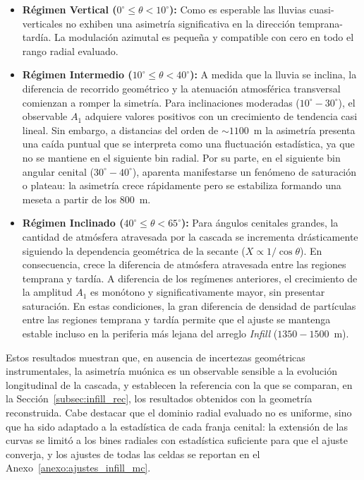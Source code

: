 \vspace{1cm}

\begin{itemize}
	\item \textbf{Régimen Vertical ($0^\circ \leq \theta < 10^\circ$):} Como es esperable las lluvias cuasi-verticales no exhiben una asimetría significativa en la dirección temprana-tardía. La modulación azimutal es pequeña y compatible con cero en todo el rango radial evaluado.
	
	\item \textbf{Régimen Intermedio ($10^\circ \leq \theta < 40^\circ$):} A medida que la lluvia se inclina, la diferencia de recorrido geométrico y la atenuación atmosférica transversal comienzan a romper la simetría. Para inclinaciones moderadas ($10^\circ - 30^\circ$), el observable $A_1$ adquiere valores positivos con un crecimiento de tendencia casi lineal. Sin embargo, a distancias del orden de $\sim 1100$~m la asimetría presenta una caída puntual que se interpreta como una fluctuación estadística, ya que no se mantiene en el siguiente bin radial. Por su parte, en el siguiente bin angular cenital ($30^\circ - 40^\circ$), aparenta manifestarse un fenómeno de saturación o plateau: la asimetría crece rápidamente pero se estabiliza formando una meseta a partir de los $800$~m.
	
	\item \textbf{Régimen Inclinado ($40^\circ \leq \theta < 65^\circ$):} Para ángulos cenitales grandes, la cantidad de atmósfera atravesada por la cascada se incrementa drásticamente siguiendo la dependencia geométrica de la secante ($X \propto 1/\cos\theta$). En consecuencia, crece la diferencia de atmósfera atravesada entre las regiones temprana y tardía. A diferencia de los regímenes anteriores, el crecimiento de la amplitud $A_1$ es monótono y significativamente mayor, sin presentar saturación. En estas condiciones, la gran diferencia de densidad de partículas entre las regiones temprana y tardía permite que el ajuste se mantenga estable incluso en la periferia más lejana del arreglo \textit{Infill} ($1350 - 1500$~m).
\end{itemize}

Estos resultados muestran que, en ausencia de incertezas geométricas instrumentales, la asimetría muónica es un observable sensible a la evolución longitudinal de la cascada, y establecen la referencia con la que se comparan, en la Sección~\ref{subsec:infill_rec}, los resultados obtenidos con la geometría reconstruida. Cabe destacar que el dominio radial evaluado no es uniforme, sino que ha sido adaptado a la estadística de cada franja cenital: la extensión de las curvas se limitó a los bines radiales con estadística suficiente para que el ajuste converja, y los ajustes de todas las celdas se reportan en el Anexo~\ref{anexo:ajustes_infill_mc}.

